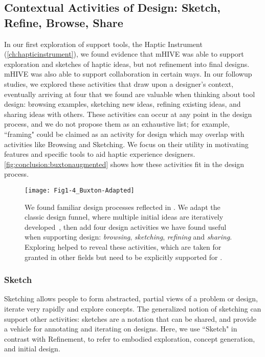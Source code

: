 \subsection{Contextual Activities of Design: Sketch, Refine, Browse, Share}
In our first exploration of \haxd support tools, the Haptic Instrument (\autoref{ch:hapticinstrument}), we found evidence that mHIVE was able to support exploration and sketches of haptic ideas, but not refinement into final designs.
mHIVE was also able to support collaboration in certain ways.
In our followup studies, we explored these activities that draw upon a designer's context, eventually arriving at four that we found are valuable when thinking about tool design: browsing examples, sketching new ideas, refining existing ideas, and sharing ideas with others.
These activities can occur at any point in the design process, and we do not propose them as an exhaustive list; for example, ``framing" \cite{Schon1982,Warr2005} could be claimed as an activity for design which may overlap with activities like Browsing and Sketching.
We focus on their utility in motivating features and specific tools to aid haptic experience designers.
\autoref{fig:conclusion:buxtonaugmented} shows how these activities fit in the design process.


\begin{figure}[htbp] %
   \centering
   \texttt{[image: Fig1-4\_Buxton-Adapted]} 
   \caption{We found familiar design processes reflected in \haxd. We adapt the classic design funnel, where multiple initial ideas are iteratively developed~\cite{Buxton2007}, then add four design activities we have found useful when supporting design: \textit{browsing}, \textit{sketching}, \textit{refining} and \textit{sharing}. Exploring \haxd helped to reveal these activities, which are taken for granted in other fields but need to be explicitly supported for \haxd.}
   \label{fig:conclusion:buxtonaugmented}
\end{figure}


%
%
\subsubsection{Sketch}
Sketching allows people to form abstracted, partial views of a problem or design, iterate very rapidly and explore concepts.
The generalized notion of sketching can support other activities: sketches are a notation that can be shared, and provide a vehicle for annotating and iterating on designs.
Here, we use ``Sketch" in contrast with Refinement, to refer to embodied exploration, concept generation, and initial design.

